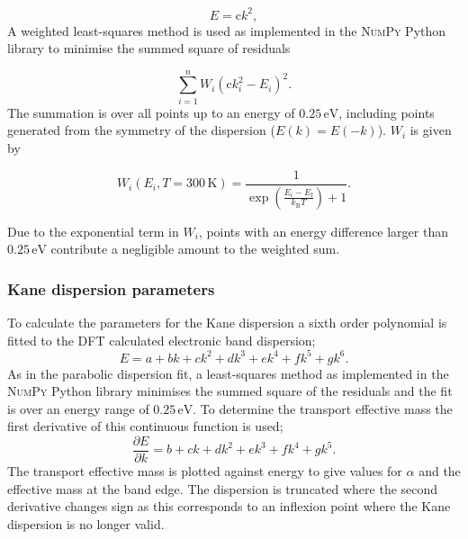 \begin{equation}
E = \mathrm{c}k^2,
\end{equation}
A weighted least-squares method is used as implemented in the \textsc{NumPy} Python library to minimise the summed square of residuals

\begin{equation}
\sum^n_{i=1}W_i(\mathrm{c}k_i^2 - E_i)^2.
\end{equation}
The summation is over all points up to an energy of $0.25\,\mathrm{eV}$, including points generated from the symmetry of the dispersion ($E(k)=E(-k)$). 
$W_i$ is given by

\begin{equation}
W_{i}(E_i,T=300\,\mathrm{K}) = \frac{1}{\exp\left(\frac{E_i-E_{\text{f}}}{k_{\text{B}}T}\right)+1}.
\end{equation}

Due to the exponential term in $W_i$, points with an energy difference larger than $0.25\,\mathrm{eV}$ contribute a negligible amount to the weighted sum. 

\subsubsection{Kane dispersion parameters}

To calculate the parameters for the Kane dispersion a sixth order polynomial is fitted to the DFT calculated electronic band dispersion;
\begin{equation}
E = a + bk + ck^2 +dk^3 + ek^4 + fk^5 +gk^6.
\end{equation}
As in the parabolic dispersion fit, a least-squares method as implemented in the \textsc{NumPy} Python library minimises the summed square of the residuals and the fit is over an energy range of $0.25\,\mathrm{eV}$. To determine the transport effective mass the first derivative of this continuous function is used; 
\begin{equation}
\frac{\partial E}{\partial k}=b+ck+dk^2+ek^3+fk^4+gk^5.
\end{equation} 
The transport effective mass is plotted against energy to give values for $\alpha$ and the effective mass at the band edge. The dispersion is truncated where the second derivative changes sign as this corresponds to an inflexion point where the Kane dispersion is no longer valid. 


